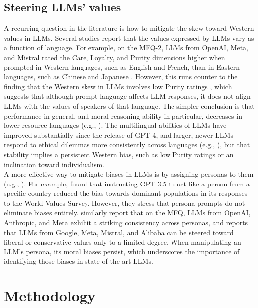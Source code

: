 \documentclass[11pt,a4paper]{article}
\begin{document}
\subsection{Steering LLMs’ values}
A recurring question in the literature is how to mitigate the skew toward Western values in LLMs. Several studies report that the values expressed by LLMs vary as a function of language. For example, on the MFQ-2, LLMs from OpenAI, Meta, and Mistral rated the Care, Loyalty, and Purity dimensions higher when prompted in Western languages, such as English and French, than in Eastern languages, such as Chinese and Japanese \cite{aksoy2025whose}. However, this runs counter to the finding that the Western skew in LLMs involves low Purity ratings \cite{zewail2025}, which suggests that although prompt language affects LLM responses, it does not align LLMs with the values of speakers of that language. The simpler conclusion is that performance in general, and moral reasoning ability in particular, decreases in lower resource languages (e.g., \citealp{arora2023probing, durmus2023towards, hammerl2023speaking, kwok2024evaluating, wang2024not}). The multilingual abilities of LLMs have improved substantially since the release of GPT-4, and larger, newer LLMs respond to ethical dilemmas more consistently across languages (e.g., \citealp{agarwal2024ethical, khandelwal2024moral, naous2024having}), but that stability implies a persistent Western bias, such as low Purity ratings or an inclination toward individualism.\\
\indent A more effective way to mitigate biases in LLMs is by assigning personas to them (e.g., \citealp{kwok2024evaluating, simmons2023moral, wang2024not, wright2024llm}). For example, \citealp{qi2025whose} found that instructing GPT-3.5 to act like a person from a specific country reduced the bias towards dominant populations in its responses to the World Values Survey. However, they stress that persona prompts do not eliminate biases entirely. \citealp{lee2024prompting} similarly report that on the MFQ, LLMs from OpenAI, Anthropic, and Meta exhibit a striking consistency across personas, and \citealp{munker2025political} reports that LLMs from Google, Meta, Mistral, and Alibaba can be steered toward liberal or conservative values only to a limited degree. When manipulating an LLM’s persona, its moral biases persist, which underscores the importance of identifying those biases in state-of-the-art LLMs.

\section{Methodology}
\end{document}
